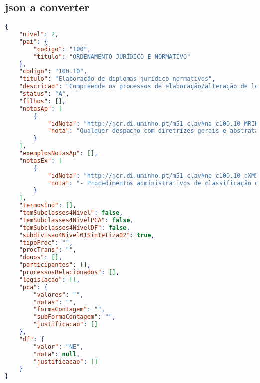 \subsection{\acrshort{json} a converter}\label{exem:json}
\begin{lstlisting}[language=json, caption=\acrshort{json} exemplo a converter]
{
    "nivel": 2,
    "pai": {
        "codigo": "100",
        "titulo": "ORDENAMENTO JURÍDICO E NORMATIVO"
    },
    "codigo": "100.10",
    "titulo": "Elaboração de diplomas jurídico-normativos",
    "descricao": "Compreende os processos de elaboração/alteração de legislação, de regulamentos e de diretivas políticas ou operacionais portuguesas.",
    "status": "A",
    "filhos": [],
    "notasAp": [
        {
            "idNota": "http://jcr.di.uminho.pt/m51-clav#na_c100.10_MRIKl-RBu_2sz5u9FzPqH",
            "nota": "Qualquer despacho com diretrizes gerais e abstratas"
        }
    ],
    "exemplosNotasAp": [],
    "notasEx": [
        {
            "idNota": "http://jcr.di.uminho.pt/m51-clav#ne_c100.10_bXM5qoj-hKZt6cijQktaj",
            "nota": "- Procedimentos administrativos de classificação do património cultural devem ser considerados em \"Reconhecimentos e permissões/ Classificação e declaração de interesse ou utilidade pública\" (450.20)"
        }
    ],
    "termosInd": [],
    "temSubclasses4Nivel": false,
    "temSubclasses4NivelPCA": false,
    "temSubclasses4NivelDF": false,
    "subdivisao4Nivel01Sintetiza02": true,
    "tipoProc": "",
    "procTrans": "",
    "donos": [],
    "participantes": [],
    "processosRelacionados": [],
    "legislacao": [],
    "pca": {
        "valores": "",
        "notas": "",
        "formaContagem": "",
        "subFormaContagem": "",
        "justificacao": []
    },
    "df": {
        "valor": "NE",
        "nota": null,
        "justificacao": []
    }
}
\end{lstlisting}

